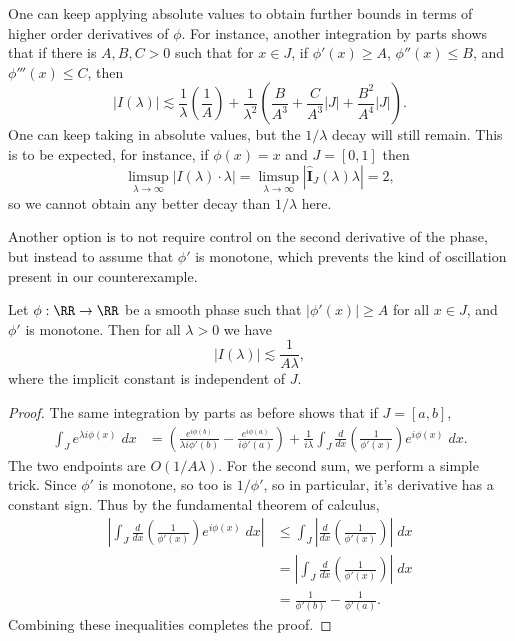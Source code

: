 One can keep applying absolute values to obtain further bounds in terms of higher order derivatives of $\phi$. For instance, another integration by parts shows that if there is $A,B,C > 0$ such that for $x \in J$, if $\phi'(x) \geq A$, $\phi''(x) \leq B$, and $\phi'''(x) \leq C$, then
%
\[ |I(\lambda)| \lesssim \frac{1}{\lambda} \left( \frac{1}{A} \right) + \frac{1}{\lambda^2} \left( \frac{B}{A^3} + \frac{C}{A^3} |J| + \frac{B^2}{A^4} |J| \right). \]
%
One can keep taking in absolute values, but the $1/\lambda$ decay will still remain. This is to be expected, for instance, if $\phi(x) = x$ and $J = [0,1]$ then
%
\[ \limsup_{\lambda \to \infty} |I(\lambda) \cdot \lambda| = \limsup_{\lambda \to \infty} |\widehat{\mathbf{I}}_J(\lambda) \lambda| = 2, \]
%
so we cannot obtain any better decay than $1/\lambda$ here.

Another option is to not require control on the second derivative of the phase, but instead to assume that $\phi'$ is monotone, which prevents the kind of oscillation present in our counterexample.

\begin{lemma}
  Let $\phi: \RR \to \RR$ be a smooth phase such that $|\phi'(x)| \geq A$ for all $x \in J$, and $\phi'$ is monotone. Then for all $\lambda > 0$ we have
  \[ |I(\lambda)| \lesssim \frac{1}{A \lambda}, \]
  where the implicit constant is independent of $J$.
\end{lemma}
\begin{proof}
  The same integration by parts as before shows that if $J = [a,b]$,
  \begin{align*}
    \int_J e^{\lambda i \phi(x)}\; dx &= \left( \frac{e^{i \phi(b)}}{\lambda i \phi'(b)} - \frac{e^{i \phi(a)}}{i \phi'(a)} \right) + \frac{1}{i\lambda} \int_J \frac{d}{dx} \left( \frac{1}{\phi'(x)} \right) e^{i \phi(x)}\; dx.
  \end{align*}
  The two endpoints are $O(1/A \lambda)$. For the second sum, we perform a simple trick. Since $\phi'$ is monotone, so too is $1/\phi'$, so in particular, it's derivative has a constant sign. Thus by the fundamental theorem of calculus,
  \begin{align*}
    \left| \int_J \frac{d}{dx} \left( \frac{1}{\phi'(x)} \right) e^{i \phi(x)}\; dx \right| &\leq \int_J \left| \frac{d}{dx} \left( \frac{1}{\phi'(x)} \right)  \right|\; dx\\
    &= \left| \int_J \frac{d}{dx} \left( \frac{1}{\phi'(x)} \right) \right|\; dx\\
    &= \frac{1}{\phi'(b)} - \frac{1}{\phi'(a)}.
  \end{align*}
  Combining these inequalities completes the proof.
\end{proof}


